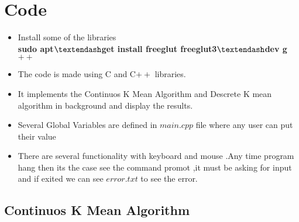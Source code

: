 \documentclass[a4paper,10pt]{report}
\begin{document}
\chapter{Code }
\begin{itemize}
 \item Install some of the libraries \\
       \textbf{sudo apt$\textendash$get install freeglut freeglut3$\textendash$dev g$++$} 
 \item The code is made using C and C$++$ libraries.
 \item It implements the Continuos K Mean Algorithm and Descrete K mean algorithm in background and display the results.
 \item Several Global Variables are defined in $main.cpp$ file where any user can put their value
 \item There are several functionality with keyboard and mouse .Any time program hang then its the case see
       the command promot ,it must be asking for input and if exited we can see $error.txt$ to see the error.
\end{itemize}
\clearpage
\section{Continuos K Mean Algorithm}
\end{document}

